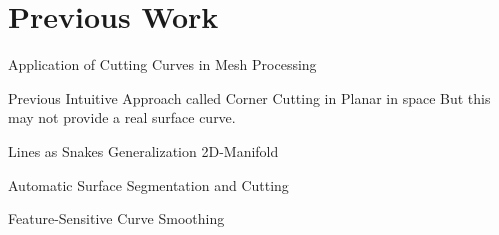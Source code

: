 \documentclass{stdlocal}
\begin{document}
\section{Previous Work} %
\label{sec:previous_work}

  Application of Cutting Curves in Mesh Processing
  \autocite{zachow2003}
  \autocite{benhabiles2011}
  \autocite{ji2006}

  Previous Intuitive Approach called Corner Cutting in Planar
  \autocite{chaikin1974}
  \autocite{dyn1992}
  in space
  \autocite{morera2008}
  But this may not provide a real surface curve.

  Lines as Snakes
  \autocite{kass1988}
  Generalization 2D-Manifold
  \autocite{bischoff2005}
  \autocite{jung2004}

  Automatic Surface Segmentation and Cutting
  \autocite{lee2002}
  \autocite{lee2004}

  Feature-Sensitive Curve Smoothing
  \autocite{lai2007}

\end{document}
